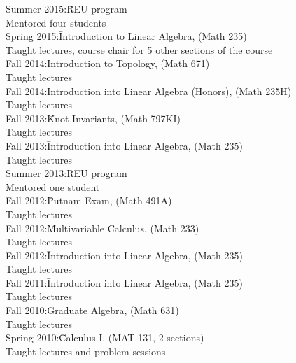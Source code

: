 \documentclass[11pt]{amsart}
\theoremstyle{plain}
\theoremstyle{definition}
\theoremstyle{remark}
\begin{document}
\begin{tabbing}
Summer 2015:\quad\= REU program\\
\>Mentored four students \\

Spring 2015:\quad\quad\= Introduction to Linear Algebra, (Math 235)\\
\>Taught lectures, course chair for 5 other sections of the course\\


Fall 2014:\quad\quad\quad\= Introduction to Topology, (Math 671)\\
\>Taught lectures \\


Fall 2014:\quad\quad\quad\= Introduction into Linear Algebra (Honors), (Math 235H)\\
\>Taught lectures \\



Fall 2013:\quad\quad\quad\= Knot Invariants, (Math 797KI)\\
\>Taught lectures \\


Fall 2013:\quad\quad\quad\= Introduction into Linear Algebra, (Math 235)\\
\>Taught lectures \\


Summer 2013:\quad\= REU program\\
\>Mentored one student \\


Fall 2012:\quad\quad\quad\= Putnam Exam, (Math 491A)\\
\>Taught lectures \\

Fall 2012:\quad\quad\quad\= Multivariable Calculus, (Math 233)\\
\>Taught lectures \\

Fall 2012:\quad\quad\quad\= Introduction into Linear Algebra, (Math 235)\\
\>Taught lectures \\

Fall 2011:\quad\quad\quad\= Introduction into Linear Algebra, (Math 235)\\
\>Taught lectures \\
Fall 2010:\quad\quad\quad\= Graduate Algebra, (Math 631)\\
\>Taught lectures \\
Spring 2010:\quad\quad\= Calculus I, (MAT 131, 2 sections)\\
 \>Taught lectures and problem sessions\\
\end{tabbing}
\end{document}
